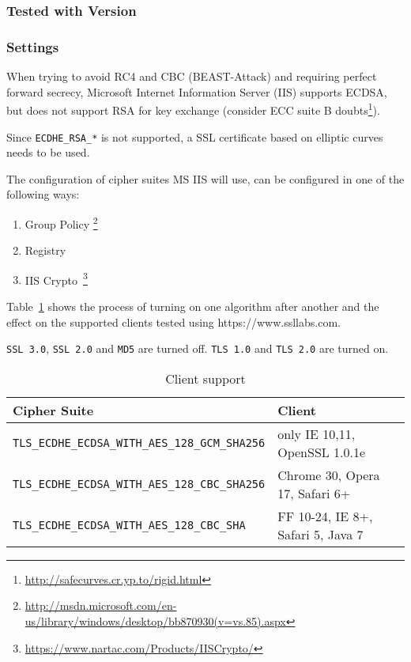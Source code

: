 \subsubsection{Tested with Version} 


\subsubsection{Settings}
When trying to avoid RC4 and CBC (BEAST-Attack) and requiring perfect
forward secrecy, Microsoft Internet Information Server (IIS) supports
ECDSA, but does not support RSA for key exchange (consider ECC suite
B doubts\footnote{\url{http://safecurves.cr.yp.to/rigid.html}}).

Since \verb|ECDHE_RSA_*| is not supported, a SSL certificate based on
elliptic curves needs to be used.

The configuration of cipher suites MS IIS will use, can be configured in one
of the following ways:
\begin{enumerate}
  \item Group Policy \footnote{\url{http://msdn.microsoft.com/en-us/library/windows/desktop/bb870930(v=vs.85).aspx}}
  \item Registry
  \item IIS Crypto~\footnote{\url{https://www.nartac.com/Products/IISCrypto/}}
\end{enumerate}


Table~\ref{tab:MS_IIS_Client_Support} shows the process of turning on
one algorithm after another and the effect on the supported clients
tested using https://www.ssllabs.com.

\verb|SSL 3.0|, \verb|SSL 2.0| and \verb|MD5| are turned off.
\verb|TLS 1.0| and \verb|TLS 2.0| are turned on.

\begin{table}[h]
  \centering
  \small
  \begin{tabular}{ll}
    \toprule
    Cipher Suite & Client \\
    \midrule
    \verb|TLS_ECDHE_ECDSA_WITH_AES_128_GCM_SHA256| & only IE 10,11, OpenSSL 1.0.1e \\
    \verb|TLS_ECDHE_ECDSA_WITH_AES_128_CBC_SHA256| & Chrome 30, Opera 17, Safari 6+ \\
    \verb|TLS_ECDHE_ECDSA_WITH_AES_128_CBC_SHA| & FF 10-24, IE 8+, Safari 5, Java 7\\
    \bottomrule 
  \end{tabular}
  \caption{Client support}
  \label{tab:MS_IIS_Client_Support}
\end{table}

